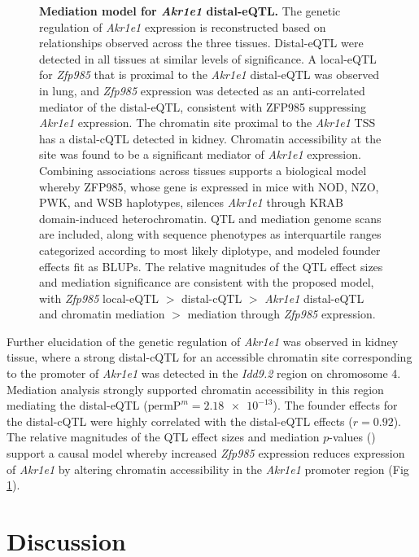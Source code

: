 \documentclass[10pt,letterpaper]{article}
\newcommand{\permpmed}{\text{permP}^{m}}
\begin{document}
\begin{figure}[h!]
\caption{\textbf{Mediation model for \textit{Akr1e1} distal-eQTL.}  The genetic regulation of \textit{Akr1e1} expression is reconstructed based on relationships observed across the three tissues. Distal-eQTL were detected in all tissues at similar levels of significance. A local-eQTL for \textit{Zfp985} that is proximal to the \textit{Akr1e1} distal-eQTL was observed in lung, and \textit{Zfp985} expression was detected as an anti-correlated mediator of the distal-eQTL, consistent with ZFP985 suppressing \textit{Akr1e1} expression. The chromatin site proximal to the \textit{Akr1e1} TSS has a distal-cQTL detected in kidney. Chromatin accessibility at the site was found to be a significant mediator of \textit{Akr1e1} expression. Combining associations across tissues supports a biological model whereby ZFP985, whose gene is expressed in mice with NOD, NZO, PWK, and WSB haplotypes, silences \textit{Akr1e1} through KRAB domain-induced heterochromatin. QTL and mediation genome scans are included, along with sequence phenotypes as interquartile ranges categorized according to most likely diplotype, and modeled founder effects fit as BLUPs. The relative magnitudes of the QTL effect sizes and mediation significance are consistent with the proposed model, with \textit{Zfp985} local-eQTL $>$ distal-cQTL $>$ \textit{Akr1e1} distal-eQTL and chromatin mediation $>$ mediation through \textit{Zfp985} expression.
\label{fig:akr1e1_full_model}}
\end{figure}
  
Further elucidation of the genetic regulation of \textit{Akr1e1} was observed in kidney tissue, where a strong distal-cQTL for an accessible chromatin site corresponding to the promoter of \textit{Akr1e1} was detected in the \textit{Idd9.2} region on chromosome 4. Mediation analysis strongly supported chromatin accessibility in this region mediating the distal-eQTL ($\permpmed = \num{2.18e-13}$). The founder effects for the distal-cQTL were highly correlated with the distal-eQTL effects ($r = 0.92$). The relative magnitudes of the QTL effect sizes and mediation $p$-values () support a causal model whereby increased \textit{Zfp985} expression reduces expression of \textit{Akr1e1} by altering chromatin accessibility in the \textit{Akr1e1} promoter region (Fig \ref{fig:akr1e1_full_model}). 

\section*{Discussion}
\end{document}
